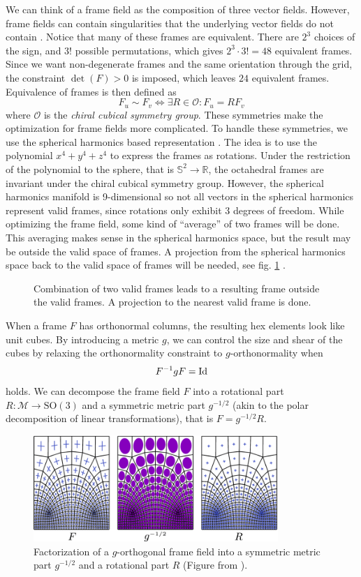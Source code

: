 \documentclass[../thesis.tex]{subfiles}
\begin{document}
We can think of a frame field as the composition of three vector fields. However, frame fields
can contain singularities that the underlying vector fields do not contain \cite{Nieser}.
Notice that many of these frames are equivalent.
There are $2^3$ choices of the sign, and $3!$ possible permutations, which
gives $2^3\cdot 3! = 48$ equivalent frames.
Since we want non-degenerate frames and the same orientation through the grid, the constraint $\det(F)>0$ is imposed,
which leaves $24$ equivalent frames.
Equivalence of frames is then defined as
$$F_u \sim F_v \iff \exists R \in \mathcal{O} : F_u=RF_v$$
where $\mathcal{O}$ is the \emph{chiral cubical symmetry group}\cite{Nieser}.
These symmetries make the optimization for frame fields more complicated.
To handle these symmetries, we use the spherical harmonics based representation \cite{Huang}.
The idea is to use the polynomial $x^4+y^4+z^4$ to express the frames as rotations.
Under the restriction of the polynomial to the sphere, that is $\mathbb{S}^2\to \mathbb{R}$, the octahedral frames
are invariant under the chiral cubical symmetry group. However, the spherical harmonics
manifold is 9-dimensional so not all vectors in the spherical harmonics represent valid frames,
since rotations only exhibit 3 degrees of freedom.
While optimizing the frame field, some kind of ``average'' of two frames will be done.
This averaging makes sense in the spherical harmonics space, but the result may be outside the valid
space of frames. A projection from the spherical
harmonics space back to the valid space of frames will be needed, see fig. \ref{fig:projection} \cite{Ray}.
\begin{figure}[htb]
  \centering
  \def\svgwidth{20em}
  
  \caption{Combination of two valid frames leads to a resulting frame outside the valid frames. A projection to the nearest valid frame is done.}
  \label{fig:projection}
\end{figure}


When a frame $F$ has orthonormal columns, the resulting hex elements look like unit cubes.
By introducing a metric $g$, we can control the size and shear of the cubes by
relaxing the orthonormality constraint to $g$-orthonormality when
$$F^{-1}gF = \operatorname{Id}$$
holds. We can decompose the frame field $F$ into a rotational part $R : \mathcal{M} \to \text{SO}(3)$ and a symmetric metric part $g^{-1/2}$
(akin to the polar decomposition of linear transformations)\cite{Panozzo}, that is $F = g^{-1/2}R$.

\begin{figure}[htb]
  \centering
  \includegraphics[width=25em]{figures/factorization}
  \caption{Factorization of a $g$-orthogonal frame field into a symmetric metric part $g^{-1/2}$ and a rotational part $R$
  (Figure from \cite{Fang23}).}
  \label{fig:factorization}
\end{figure}
\end{document}
